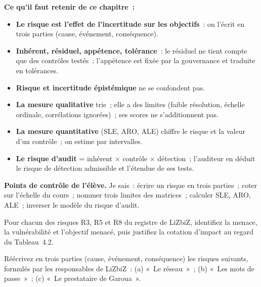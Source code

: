 \begin{boxresume}
\textbf{Ce qu'il faut retenir de ce chapitre~:}
\begin{itemize}
    \item \textbf{Le risque est l'effet de l'incertitude sur les objectifs}~:
          on l'écrit en trois parties (cause, événement, conséquence).
    \item \textbf{Inhérent, résiduel, appétence, tolérance}~: le résiduel ne
          tient compte que des contrôles testés~; l'appétence est fixée par
          la gouvernance et traduite en tolérances.
    \item \textbf{Risque et incertitude épistémique} ne se confondent pas.
    \item \textbf{La mesure qualitative} trie~; elle a des limites (faible
          résolution, échelle ordinale, corrélations ignorées)~; ses scores
          ne s'additionnent pas.
    \item \textbf{La mesure quantitative} (SLE, ARO, ALE) chiffre le risque
          et la valeur d'un contrôle~; on estime par intervalles.
    \item \textbf{Le risque d'audit} = inhérent × contrôle × détection~;
          l'auditeur en déduit le risque de détection admissible et
          l'étendue de ses tests.
\end{itemize}
\end{boxresume}

\begin{boxinfo}
\textbf{Points de contrôle de l'élève.} Je sais~: écrire un risque en trois
parties~; coter sur l'échelle du cours~; nommer trois limites des
matrices~; calculer SLE, ARO, ALE~; inverser le modèle du risque d'audit.
\end{boxinfo}

\bigskip

\begin{boxexo}[title={\ding{45}\quad Exercice~4.1. Menace, vulnérabilité, impact \niveaubase}]
Pour chacun des risques R3, R5 et R8 du registre de LiZbiZ, identifiez la
menace, la vulnérabilité et l'objectif menacé, puis justifiez la cotation
d'impact au regard du Tableau~4.2.
\end{boxexo}

\begin{boxexo}[title={\ding{45}\quad Exercice~4.2. Écrire un risque \niveaubase}]
Réécrivez en trois parties (cause, événement, conséquence) les risques
suivants, formulés par les responsables de LiZbiZ~: (a) «~Le réseau~»~;
(b) «~Les mots de passe~»~; (c) «~Le prestataire de Garoua~».
\end{boxexo}

